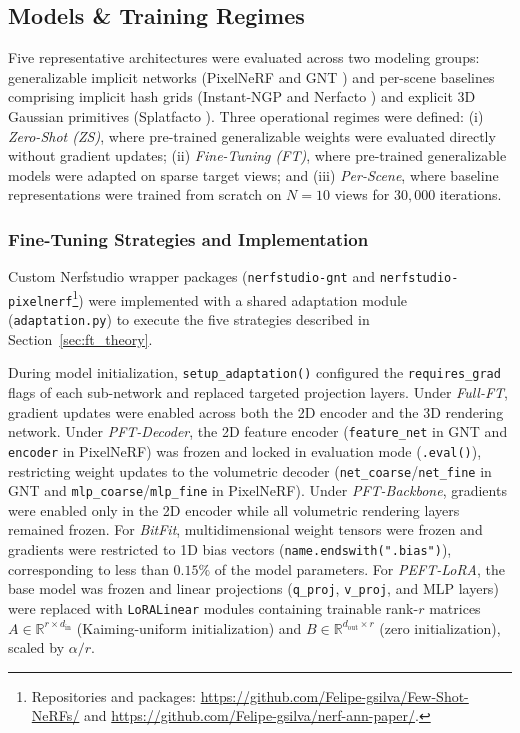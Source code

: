 \subsection{Models \& Training Regimes}
\label{sec:regimes}
Five representative architectures were evaluated across two modeling groups: generalizable implicit networks (PixelNeRF \cite{yu2021pixelnerfneuralradiancefields} and GNT \cite{t2023attentionnerfneeds}) and per-scene baselines comprising implicit hash grids (Instant-NGP \cite{muller2022} and Nerfacto \cite{Tancik2023}) and explicit 3D Gaussian primitives (Splatfacto \cite{kerbl3Dgaussians}). Three operational regimes were defined: (i) \textit{Zero-Shot (ZS)}, where pre-trained generalizable weights were evaluated directly without gradient updates; (ii) \textit{Fine-Tuning (FT)}, where pre-trained generalizable models were adapted on sparse target views; and (iii) \textit{Per-Scene}, where baseline representations were trained from scratch on $N=10$ views for $30,000$ iterations.

\subsubsection{Fine-Tuning Strategies and Implementation}
Custom Nerfstudio wrapper packages (\texttt{nerfstudio-gnt} and \texttt{nerfstudio-pixelnerf}\footnote{Repositories and packages: \url{https://github.com/Felipe-gsilva/Few-Shot-NeRFs/} and \url{https://github.com/Felipe-gsilva/nerf-ann-paper/}.}) were implemented with a shared adaptation module (\texttt{adaptation.py}) to execute the five strategies described in Section~\ref{sec:ft_theory}.

During model initialization, \texttt{setup\_adaptation()} configured the \texttt{requires\_grad} flags of each sub-network and replaced targeted projection layers. Under \textit{Full-FT}, gradient updates were enabled across both the 2D encoder and the 3D rendering network. Under \textit{PFT-Decoder}, the 2D feature encoder (\texttt{feature\_net} in GNT and \texttt{encoder} in PixelNeRF) was frozen and locked in evaluation mode (\texttt{.eval()}), restricting weight updates to the volumetric decoder (\texttt{net\_coarse}/\texttt{net\_fine} in GNT and \texttt{mlp\_coarse}/\texttt{mlp\_fine} in PixelNeRF). Under \textit{PFT-Backbone}, gradients were enabled only in the 2D encoder while all volumetric rendering layers remained frozen. For \textit{BitFit}, multidimensional weight tensors were frozen and gradients were restricted to 1D bias vectors (\texttt{name.endswith(".bias")}), corresponding to less than $0.15\%$ of the model parameters. For \textit{PEFT-LoRA}, the base model was frozen and linear projections (\texttt{q\_proj}, \texttt{v\_proj}, and MLP layers) were replaced with \texttt{LoRALinear} modules containing trainable rank-$r$ matrices $A \in \mathbb{R}^{r \times d_{\text{in}}}$ (Kaiming-uniform initialization) and $B \in \mathbb{R}^{d_{\text{out}} \times r}$ (zero initialization), scaled by $\alpha/r$.

